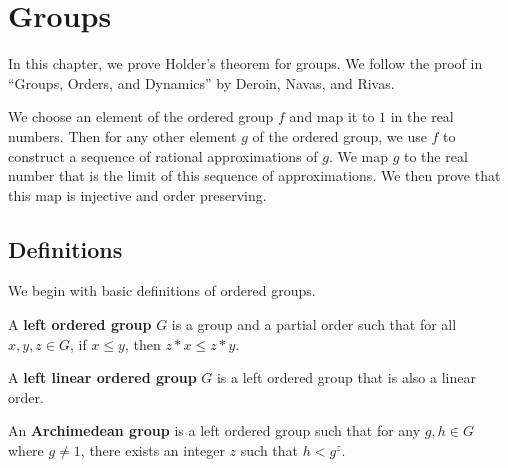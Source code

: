 %

\chapter{Groups}
In this chapter, we prove Holder's theorem for groups. We follow the proof in
``Groups, Orders, and Dynamics'' by Deroin, Navas, and Rivas.

We choose an element of the ordered group $f$ and map it to $1$ in the real numbers.
Then for any other element $g$ of the ordered group, we use $f$ to construct
a sequence of rational approximations of $g$. We map $g$ to the real number that
is the limit of this sequence of approximations. We then prove that this map is
injective and order preserving.

\section{Definitions}
We begin with basic definitions of ordered groups.

\begin{definition}\label{def:LeftOrderedGroup}
    \leanok
    A \textbf{left ordered group} $G$ is a group and a partial order such that for all $x, y, z \in G$,
    if $x \le y$, then $z * x \le z * y$.
\end{definition}

\begin{definition}\label{def:LeftLinearOrderedGroup}
    \leanok
    A \textbf{left linear ordered group} $G$ is a left ordered group that is also a linear order.
\end{definition}

\begin{definition}\label{def:archimedean_group}
    \leanok
    An \textbf{Archimedean group} is a left ordered group such that
    for any $g, h \in G$ where $g \ne 1$, there exists an integer $z$
    such that $h < g^z$.
\end{definition}

